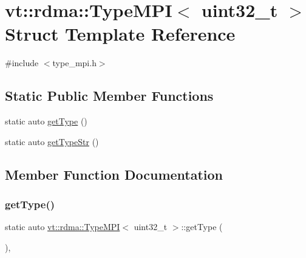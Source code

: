\hypertarget{structvt_1_1rdma_1_1_type_m_p_i_3_01uint32__t_01_4}{}\section{vt\+:\+:rdma\+:\+:Type\+M\+PI$<$ uint32\+\_\+t $>$ Struct Template Reference}
\label{structvt_1_1rdma_1_1_type_m_p_i_3_01uint32__t_01_4}


{\ttfamily \#include $<$type\+\_\+mpi.\+h$>$}

\subsection*{Static Public Member Functions}
\begin{DoxyCompactItemize}
\item 
static auto \hyperlink{structvt_1_1rdma_1_1_type_m_p_i_3_01uint32__t_01_4_a8fa3770889821082faed91a5260cacb8}{get\+Type} ()
\item 
static auto \hyperlink{structvt_1_1rdma_1_1_type_m_p_i_3_01uint32__t_01_4_ae991f187aeeaffdebe750c628a722642}{get\+Type\+Str} ()
\end{DoxyCompactItemize}


\subsection{Member Function Documentation}
\mbox{\label{structvt_1_1rdma_1_1_type_m_p_i_3_01uint32__t_01_4_a8fa3770889821082faed91a5260cacb8}} 
\subsubsection{\texorpdfstring{get\+Type()}{getType()}}
{\footnotesize\ttfamily static auto \hyperlink{structvt_1_1rdma_1_1_type_m_p_i}{vt\+::rdma\+::\+Type\+M\+PI}$<$ uint32\+\_\+t $>$\+::get\+Type (\begin{DoxyParamCaption}{ }\end{DoxyParamCaption})\hspace{0.3cm}{\ttfamily [inline]}, {\ttfamily [static]}}

